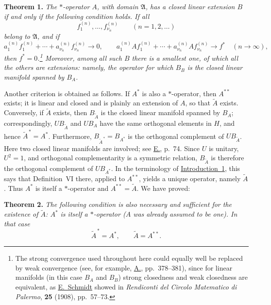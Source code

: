 \documentclass[fontsize=13pt,paper=b5,leqno,bookmarkpackage=false]{scrartcl}
\begin{document}
\par\smallskip
{}
\label{thm:1}
\noindent\textbf{Theorem 1.}
\textit{The \(*\)-operator \(A\), with domain \(\mathfrak A\), has a closed
linear extension \(B\) if and only if the following condition holds.  If
all}
\[
  f_1^{(n)},\ldots,f_{\nu_n}^{(n)}
  \qquad (n=1,2,\ldots)
\]
\textit{belong to \(\mathfrak A\), and if}
\[
  a_1^{(n)}f_1^{(n)}+\cdots+
  a_{\nu_n}^{(n)}f_{\nu_n}^{(n)}\longrightarrow0,
  \qquad
  a_1^{(n)}Af_1^{(n)}+\cdots+
  a_{\nu_n}^{(n)}Af_{\nu_n}^{(n)}
  \longrightarrow f^*
  \quad(n\to\infty),
\]
\textit{then \(f^*=0\).\footnote{\label{fn:16}The strong convergence used
throughout here could equally well be replaced by weak convergence (see,
for example, \hyperlink{bib:A}{A.}, pp.~378--381), since for linear
manifolds (in this case \(B_A\) and \(B_B\)) strong closedness and weak
closedness are equivalent, as
\hypertarget{bib:Schmidt1908}{\href{https://doi.org/10.1007/BF03029116}{%
E.~Schmidt}} showed in \emph{Rendiconti del Circolo Matematico di Palermo},
\textbf{25} (1908), pp.~57--73.}  Moreover, among all such \(B\) there is a
smallest one, of which all the others are extensions: namely, the operator
for which \(B_B\) is the closed linear manifold spanned by \(B_A\).}

Another criterion is obtained as follows.  If \(A^*\) is also a
\(*\)-operator, then \(A^{**}\) exists; it is linear and closed and is
plainly an extension of \(A\), so that \(\widetilde A\) exists.  Conversely,
if \(\widetilde A\) exists, then \(B_{\widetilde A}\) is the closed linear
manifold spanned by \(B_A\); correspondingly, \(UB_{\widetilde A}\) and
\(UB_A\)
have the same orthogonal elements in \(H\), and hence
\(\widetilde A^{\,*}=A^*\).  Furthermore,
\(B_{\widetilde A^{\,*}}=B_{A^*}\) is the orthogonal complement of
\(UB_{\widetilde A}\).  Here two closed linear manifolds are involved; see
\hyperlink{bib:E}{E.}, p.~74.  Since \(U\) is unitary, \(U^2=1\), and
orthogonal complementarity is a symmetric relation, \(B_{\widetilde A}\)
is therefore the orthogonal complement of \(UB_{A^*}\).  In the terminology
of \hyperref[intro:1]{Introduction~1}, this says that Definition~VI there,
applied to \(A^{**}\), yields a unique operator, namely \(\widetilde A\).
Thus \(A^*\) is itself a \(*\)-operator and
\(A^{**}=\widetilde A\).  We have proved:

\par\smallskip
{}
\label{thm:2}
\noindent\textbf{Theorem 2.}
\textit{The following condition is also necessary and sufficient for the
existence of \(\widetilde A\): \(A^*\) is itself a \(*\)-operator
(\(A\) was already assumed to be one).  In that case}
\[
  \widetilde A^{\,*}=A^*,
  \qquad
  \widetilde A=A^{**}.
\]
\end{document}

